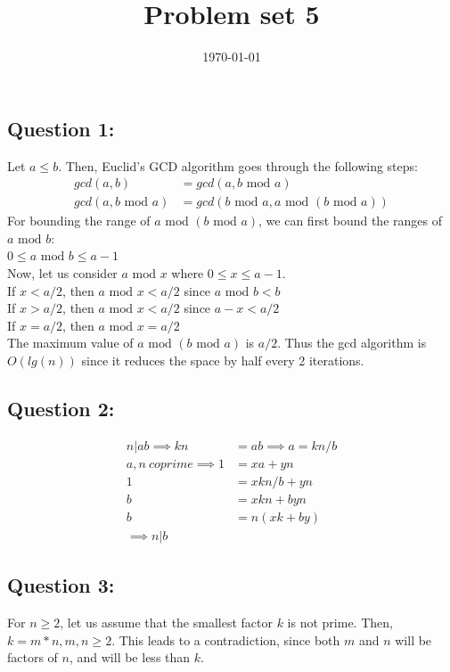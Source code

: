 \documentclass{article}
\title{Problem set 5}
\date\today
\renewcommand{\mod}{\text{ mod }}
\begin{document}
\maketitle
\subsection*{Question 1:}
	

Let $a \le b$. Then, Euclid's GCD algorithm goes through the following steps:
\begin{align*}
gcd(a,b) &= gcd(a, b \mod a) \\
gcd(a , b \mod a) &= gcd(b \mod a, a \mod (b \mod a))
\end{align*}
For bounding the range of $ a \mod (b \mod a)$, we can first bound the ranges of  $a\mod b$:\\
\indent$ 0 \le a \mod b \le a-1$ \\

\noindent Now, let us consider $a \mod x$ where $0 \le x \le a-1$.\\
\indent If $x < a/2 $, then $a \mod x < a/2$ since $a \mod b < b$\\
\indent If $x > a/2 $, then $a \mod x < a/2$ since $a - x < a/2$\\
\indent If $x = a/2 $, then $a \mod x = a/2$\\

\noindent The maximum value of $ a \mod (b \mod a)$ is $a/2$. Thus the gcd algorithm is $O(lg(n))$ since it reduces the space by half every 2 iterations.

\subsection*{Question 2:}
\begin{align*}	
n | ab \implies kn &= ab  \implies a = kn/b\\
a,n \ coprime \implies 1 &= xa + yn \\
1 &= xkn/b + yn \\
b &= xkn + byn\\
b &= n(xk + by)\\
\implies n | b
\end{align*}

\subsection*{Question 3:}

For $n \ge 2$, let us assume that the smallest factor $k$ is not prime. Then, $k = m*n, m,n \ge 2$. This leads to a contradiction, since both $m$ and $n$ will be factors of $n$, and will be less than $k$.
\end{document}
